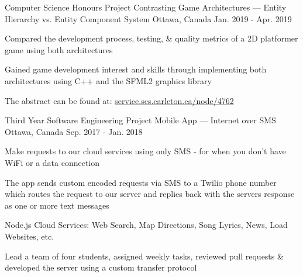 
\begin{cventries}
	\cventry
		{Computer Science Honours Project}
		{Contrasting Game Architectures --- Entity Hierarchy vs. Entity Component System}
		{Ottawa, Canada}
		{Jan. 2019 - Apr. 2019}
		{\begin{cvitems}
			\item Compared the development process, testing, \& quality metrics of a 2D platformer game using both architectures
			\item Gained game development interest and skills through implementing both architectures using C++ and the SFML2 graphics library
			\item The abstract can be found at: \href{https://service.scs.carleton.ca/node/4762}{service.scs.carleton.ca/node/4762}
		\end{cvitems}}

	\cventry
		{Third Year Software Engineering Project}
		{Mobile App --- Internet over SMS}
		{Ottawa, Canada}
		{Sep. 2017 - Jan. 2018}
		{\begin{cvitems}
			\item Make requests to our cloud services using only SMS - for when you don't have WiFi or a data connection
			\item The app sends custom encoded requests via SMS to a Twilio phone number which routes the request to our server and replies back with the servers response as one or more text messages
			\item Node.js Cloud Services: Web Search, Map Directions, Song Lyrics, News, Load Websites, etc.
			\item Lead a team of four students, assigned weekly tasks, reviewed pull requests \& developed the server using a custom transfer protocol
		\end{cvitems}}
\end{cventries}